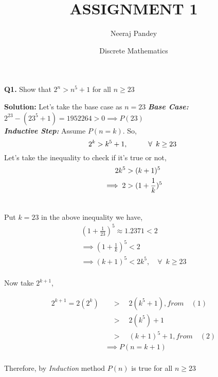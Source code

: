 \documentclass{article}
\title{ASSIGNMENT 1}
\author{Neeraj Pandey }
\date{Discrete Mathematics}
\begin{document}
\maketitle
\begin {flushleft}
\textbf{Q1.}  Show that \(2^n > n^5+1\) for all \(n\geq23\)
\end {flushleft}
\newcommand\tab[1][1cm]{\hspace*{#1}}
\begin {flushleft}
\textbf{Solution: }Let's take the base case as \(n=23\)
\newline
\newline
\tab[1.5cm]\textbf{\textit{Base Case:}}
\(2^{23} - (23^5+1) = 1952264 > 0 \implies P(23)\) \\
\tab[1.5cm]\textbf{\textit{Inductive Step:}} Assume $P(n=k)$. So,
\begin{equation}
\bigskip2^k>k^5+1,  \tab[1cm] \forall\enspace k\geq23\ \label{1}
\end{equation}
\tab[1.5cm]Let's take the inequality to check if it's true or not,
\begin{align*}
2k^5&>(k+1)^5\\
\implies 2&>(1+\frac{1}{k})^5\\
\newline
\end{align*} 
\end{flushleft}
\begin{flushleft}
\tab[1.5cm]Put $k=23$ in the above inequality we have,
\begin{align*}
(1+\frac{1}{23})^5\approx1.2371<2\\
\implies (1+\frac{1}{k})^5<2\\
\implies (k+1)^5<2k^5, \quad \forall\enspace k\geq23\\ 
\end{align*}
\begin{equation}
\label{2}
\end{equation}

\tab[1.5cm]Now take $2^{k+1}$,

\begin{align*}
2^{k+1}=2(2^k)&\quad>\quad2(k^5+1)  ,from\quad (1)\\
&\quad>\quad2(k^5)+1\\
&\quad>\quad(k+1)^5+1  ,from \quad (2)\\
&\implies P(n=k+1)
\end{align*}
\\\tab[1.5cm]Therefore, by \large{\textit{Induction}} method $P(n)$ is true for all $n\geq 23$ 
\end{flushleft}
\end{document}
